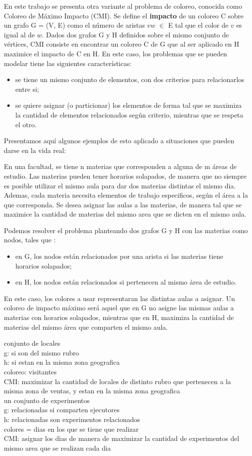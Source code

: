 En este trabajo se presenta otra variante al problema de coloreo, conocida como Coloreo de M\'aximo Impacto (CMI).
Se define el \textbf{impacto} de un coloreo C sobre un grafo G = (V, E) como el n\'umero de aristas $vw$ $\in $ E tal que el color de $v$ es igual al de $w$.
Dados dos grafos G y H definidos sobre el mismo conjunto de v\'ertices, CMI consiste en encontrar un coloreo C de G que al ser aplicado en H maximice el impacto de C en H. 
En este caso, los problemas que se pueden modelar tiene las siguientes caracter\'isticas:
\begin{itemize}
	\item se tiene un mismo conjunto de elementos, con dos criterios para relacionarlos entre si;
	\item se quiere asignar (o particionar) los elementos de forma tal que se maximiza la cantidad de elementos relacionados seg\'un criterio, mientras que se respeta el otro.
\end{itemize}
	
Presentamos aqu\'i algunos ejemplos de esto aplicado a situaciones que pueden darse en la vida real:

En una facultad, se tiene n materias que corresponden a alguna de m \'areas de estudio.
Las materias pueden tener horarios solapados, de manera que no siempre es posible utilizar el mismo aula para dar dos materias distintas el mismo dia.
Ademas, cada materia necesita elementos de trabajo especificos, seg\'un el \'area a la que corresponda.
Se desea asignar las aulas a las materias, de manera tal que se maximice la cantidad de materias del mismo area que se dicten en el mismo aula.

Podemos resolver el problema planteando dos grafos G y H con las materias como nodos, tales que :
\begin{itemize}
	\item en G, los nodos est\'an relacionados por una arista si las materias tiene horarios solapados;
	\item en H, los nodos est\'an relacionados si pertenecen al mismo \'area de estudio.  
\end{itemize}
En este caso, los colores a usar representaran las distintas aulas a asignar.
Un coloreo de impacto m\'aximo ser\'a aquel que en G no asigne las mismas aulas a materias con horarios solapados, mientras que en H, maximiza la cantidad de materias del mismo \'area que comparten el mismo aula.



conjunto de locales\\
g: si son del mismo rubro\\
h: si estan en la misma zona geografica\\
coloreo: visitantes\\
CMI: maximizar la cantidad de locales de distinto rubro que pertenecen a la misma zona de ventas, y estan en la misma zona geografica\\


un conjunto de experimentos\\
g: relacionadas si comparten ejecutores\\
h: relacionadas son experimentos relacionados\\
colores = dias en los que se tiene que realizar \\
CMI: asignar los dias de manera de maximizar la cantidad de experimentos del mismo area que se realizan cada dia\\

